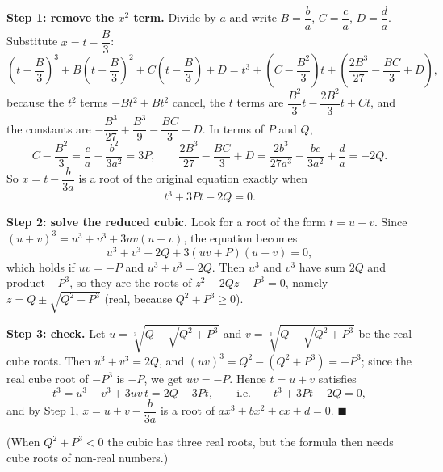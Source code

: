 \textbf{Step 1: remove the $x^2$ term.} Divide by $a$ and write $B=\dfrac ba$, $C=\dfrac ca$, $D=\dfrac da$. Substitute $x=t-\dfrac B3$:
\[\left(t-\dfrac B3\right)^3+B\left(t-\dfrac B3\right)^2+C\left(t-\dfrac B3\right)+D=t^3+\left(C-\dfrac{B^2}{3}\right)t+\left(\dfrac{2B^3}{27}-\dfrac{BC}{3}+D\right),\]
because the $t^2$ terms $-Bt^2+Bt^2$ cancel, the $t$ terms are $\dfrac{B^2}{3}t-\dfrac{2B^2}{3}t+Ct$, and the constants are $-\dfrac{B^3}{27}+\dfrac{B^3}{9}-\dfrac{BC}{3}+D$. In terms of $P$ and $Q$,
\[C-\dfrac{B^2}{3}=\dfrac ca-\dfrac{b^2}{3a^2}=3P,\qquad\dfrac{2B^3}{27}-\dfrac{BC}{3}+D=\dfrac{2b^3}{27a^3}-\dfrac{bc}{3a^2}+\dfrac da=-2Q.\]
So $x=t-\dfrac{b}{3a}$ is a root of the original equation exactly when
\[t^3+3Pt-2Q=0.\]

\textbf{Step 2: solve the reduced cubic.} Look for a root of the form $t=u+v$. Since $(u+v)^3=u^3+v^3+3uv(u+v)$, the equation becomes
\[u^3+v^3-2Q+3(uv+P)(u+v)=0,\]
which holds if $uv=-P$ and $u^3+v^3=2Q$. Then $u^3$ and $v^3$ have sum $2Q$ and product $-P^3$, so they are the roots of $z^2-2Qz-P^3=0$, namely $z=Q\pm\sqrt{Q^2+P^3}$ (real, because $Q^2+P^3\ge0$).

\textbf{Step 3: check.} Let $u=\sqrt[3]{Q+\sqrt{Q^2+P^3}}$ and $v=\sqrt[3]{Q-\sqrt{Q^2+P^3}}$ be the real cube roots. Then $u^3+v^3=2Q$, and $(uv)^3=Q^2-\left(Q^2+P^3\right)=-P^3$; since the real cube root of $-P^3$ is $-P$, we get $uv=-P$. Hence $t=u+v$ satisfies
\[t^3=u^3+v^3+3uv\,t=2Q-3Pt,\qquad\text{i.e.}\qquad t^3+3Pt-2Q=0,\]
and by Step 1, $x=u+v-\dfrac{b}{3a}$ is a root of $ax^3+bx^2+cx+d=0$. $\blacksquare$

(When $Q^2+P^3<0$ the cubic has three real roots, but the formula then needs cube roots of non-real numbers.)
